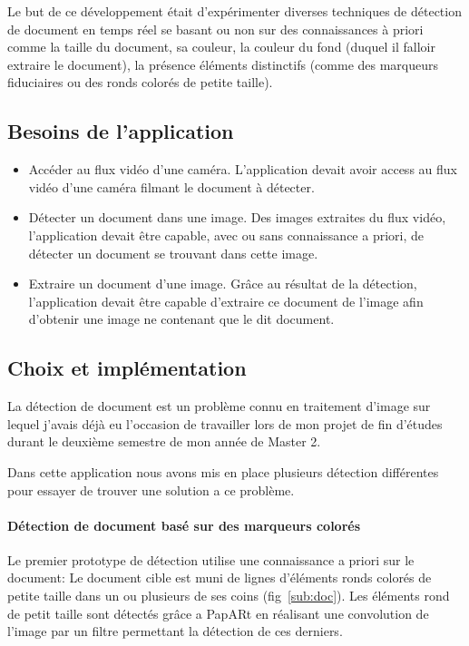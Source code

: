 Le but de ce développement était d'expérimenter diverses techniques de détection de document en temps réel se basant ou non sur des connaissances à priori comme la taille du document, sa couleur, la couleur du fond (duquel il falloir extraire le document), la présence éléments distinctifs (comme des marqueurs fiduciaires ou des ronds colorés de petite taille).

\subsection{Besoins de l'application}
\label{subsec:doc:content}
\begin{itemize}
\item Accéder au flux vidéo d'une caméra. L'application devait avoir access au flux vidéo d'une caméra filmant le document à détecter.
\item Détecter un document dans une image. Des images extraites du flux vidéo, l'application devait être capable, avec ou sans connaissance a priori, de détecter un document se trouvant dans cette image.
\item Extraire un document d'une image. Grâce au résultat de la détection, l'application devait être capable d'extraire ce document de l'image afin d'obtenir une image ne contenant que le dit document.
\end{itemize}

\subsection{Choix et implémentation}
\label{subsec:doc:impl}

La détection de document est un problème connu en traitement d'image sur lequel j'avais déjà eu l'occasion de travailler lors de mon projet de fin d'études durant le deuxième semestre de mon année de Master 2.

Dans cette application nous avons mis en place plusieurs détection différentes pour essayer de trouver une solution a ce problème.

\paragraph{Détection de document basé sur des marqueurs colorés} Le premier prototype de détection utilise une connaissance a priori sur le document: Le document cible est muni de lignes d'éléments ronds colorés de petite taille dans un ou plusieurs de ses coins (fig~\ref{sub:doc}). Les éléments rond de petit taille sont détectés grâce a PapARt en réalisant une convolution de l'image par un filtre permettant la détection de ces derniers.


